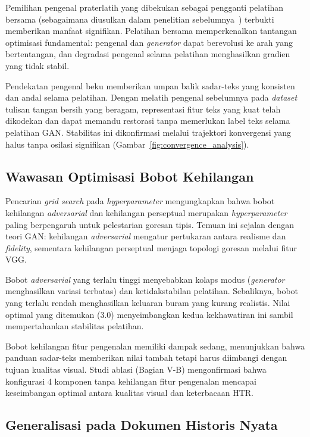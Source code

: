 \documentclass[journal]{IEEEtran}
\begin{document}
Pemilihan pengenal praterlatih yang dibekukan sebagai pengganti pelatihan bersama (sebagaimana diusulkan dalam penelitian sebelumnya~\cite{souibgui2021enhance}) terbukti memberikan manfaat signifikan. Pelatihan bersama memperkenalkan tantangan optimisasi fundamental: pengenal dan \textit{generator} dapat berevolusi ke arah yang bertentangan, dan degradasi pengenal selama pelatihan menghasilkan gradien yang tidak stabil.

Pendekatan pengenal beku memberikan umpan balik sadar-teks yang konsisten dan andal selama pelatihan. Dengan melatih pengenal sebelumnya pada \textit{dataset} tulisan tangan bersih yang beragam, representasi fitur teks yang kuat telah dikodekan dan dapat memandu restorasi tanpa memerlukan label teks selama pelatihan GAN. Stabilitas ini dikonfirmasi melalui trajektori konvergensi yang halus tanpa osilasi signifikan (Gambar~\ref{fig:convergence_analysis}).

\subsection{Wawasan Optimisasi Bobot Kehilangan}

Pencarian \textit{grid search} pada \textit{hyperparameter} mengungkapkan bahwa bobot kehilangan \textit{adversarial} dan kehilangan perseptual merupakan \textit{hyperparameter} paling berpengaruh untuk pelestarian goresan tipis. Temuan ini sejalan dengan teori GAN: kehilangan \textit{adversarial} mengatur pertukaran antara realisme dan \textit{fidelity}, sementara kehilangan perseptual menjaga topologi goresan melalui fitur VGG.

Bobot \textit{adversarial} yang terlalu tinggi menyebabkan kolaps modus (\textit{generator} menghasilkan variasi terbatas) dan ketidakstabilan pelatihan. Sebaliknya, bobot yang terlalu rendah menghasilkan keluaran buram yang kurang realistis. Nilai optimal yang ditemukan (3.0) menyeimbangkan kedua kekhawatiran ini sambil mempertahankan stabilitas pelatihan.

Bobot kehilangan fitur pengenalan memiliki dampak sedang, menunjukkan bahwa panduan sadar-teks memberikan nilai tambah tetapi harus diimbangi dengan tujuan kualitas visual. Studi ablasi (Bagian V-B) mengonfirmasi bahwa konfigurasi 4 komponen tanpa kehilangan fitur pengenalan mencapai keseimbangan optimal antara kualitas visual dan keterbacaan HTR.

\subsection{Generalisasi pada Dokumen Historis Nyata}
\end{document}
